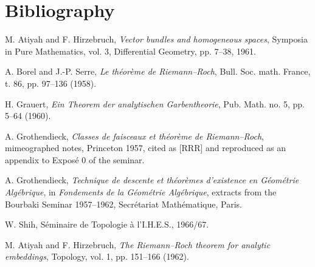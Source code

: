 \documentclass[11pt]{article}
\begin{document}
\section*{Bibliography}
\begin{enumerate}[label={[\arabic*]},leftmargin=2.5em]
\item M. Atiyah and F. Hirzebruch, \emph{Vector bundles and homogeneous spaces}, Symposia in Pure Mathematics, vol. 3, Differential Geometry, pp. 7--38, 1961.
\item A. Borel and J.-P. Serre, \emph{Le th\'eor\`eme de Riemann--Roch}, Bull. Soc. math. France, t. 86, pp. 97--136 (1958).
\item H. Grauert, \emph{Ein Theorem der analytischen Garbentheorie}, Pub. Math. no. 5, pp. 5--64 (1960).
\item A. Grothendieck, \emph{Classes de faisceaux et th\'eor\`eme de Riemann--Roch}, mimeographed notes, Princeton 1957, cited as [RRR] and reproduced as an appendix to Expos\'e 0 of the seminar.
\item A. Grothendieck, \emph{Technique de descente et th\'eor\`emes d'existence en G\'eom\'etrie Alg\'ebrique}, in \emph{Fondements de la G\'eom\'etrie Alg\'ebrique}, extracts from the Bourbaki Seminar 1957--1962, Secr\'etariat Math\'ematique, Paris.
\item W. Shih, S\'eminaire de Topologie \`a l'I.H.E.S., 1966/67.
\item M. Atiyah and F. Hirzebruch, \emph{The Riemann--Roch theorem for analytic embeddings}, Topology, vol. 1, pp. 151--166 (1962).
\end{enumerate}
\end{document}
